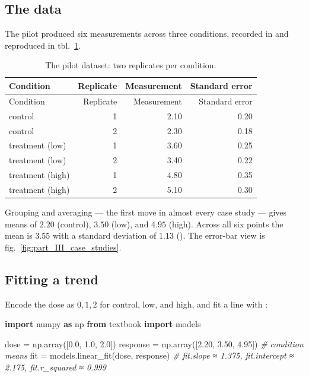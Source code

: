 \documentclass[
]{article}
\newenvironment{Shaded}{}{}
\newcommand{\CommentTok}[1]{\textcolor[rgb]{0.38,0.63,0.69}{\textit{#1}}}
\newcommand{\FloatTok}[1]{\textcolor[rgb]{0.25,0.63,0.44}{#1}}
\newcommand{\ImportTok}[1]{\textcolor[rgb]{0.00,0.50,0.00}{\textbf{#1}}}
\newcommand{\NormalTok}[1]{#1}
\newcommand{\OperatorTok}[1]{\textcolor[rgb]{0.40,0.40,0.40}{#1}}
\theoremstyle{plain}
\theoremstyle{definition}
\begin{document}
\subsection{The data}\label{the-data}

The pilot produced six measurements across three conditions, recorded in
 and reproduced in
tbl.~\ref{tbl:part_III_case_studies_data}.

\begin{longtable}[]{@{}lrrr@{}}
\caption{The pilot dataset: two replicates per
condition.}\label{tbl:part_III_case_studies_data}\tabularnewline
\toprule\noalign{}
Condition & Replicate & Measurement & Standard error \\
\midrule\noalign{}
\endfirsthead
\toprule\noalign{}
Condition & Replicate & Measurement & Standard error \\
\midrule\noalign{}
\endhead
\bottomrule\noalign{}
\endlastfoot
control & 1 & 2.10 & 0.20 \\
control & 2 & 2.30 & 0.18 \\
treatment (low) & 1 & 3.60 & 0.25 \\
treatment (low) & 2 & 3.40 & 0.22 \\
treatment (high) & 1 & 4.80 & 0.35 \\
treatment (high) & 2 & 5.10 & 0.30 \\
\end{longtable}

Grouping and averaging --- the first move in almost every case study ---
gives means of \(2.20\) (control), \(3.50\) (low), and \(4.95\) (high).
Across all six points the mean is \(3.55\) with a standard deviation of
\(1.13\) (). The
error-bar view is fig.~\ref{fig:part_III_case_studies}.

\subsection{Fitting a trend}\label{fitting-a-trend}

Encode the dose as \(0, 1, 2\) for control, low, and high, and fit a
line with :

\begin{Shaded}
\begin{Highlighting}[]
\ImportTok{import}\NormalTok{ numpy }\ImportTok{as}\NormalTok{ np}
\ImportTok{from}\NormalTok{ textbook }\ImportTok{import}\NormalTok{ models}

\NormalTok{dose }\OperatorTok{=}\NormalTok{ np.array([}\FloatTok{0.0}\NormalTok{, }\FloatTok{1.0}\NormalTok{, }\FloatTok{2.0}\NormalTok{])}
\NormalTok{response }\OperatorTok{=}\NormalTok{ np.array([}\FloatTok{2.20}\NormalTok{, }\FloatTok{3.50}\NormalTok{, }\FloatTok{4.95}\NormalTok{])   }\CommentTok{\# condition means}
\NormalTok{fit }\OperatorTok{=}\NormalTok{ models.linear\_fit(dose, response)}
\CommentTok{\# fit.slope ≈ 1.375, fit.intercept ≈ 2.175, fit.r\_squared ≈ 0.999}
\end{Highlighting}
\end{Shaded}
\end{document}

